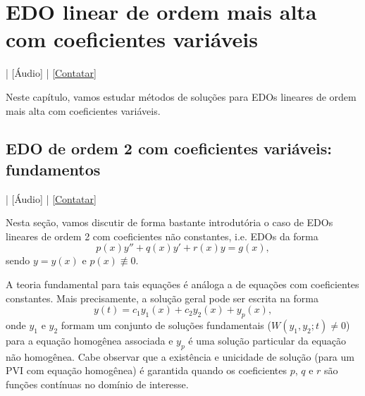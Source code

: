 
\chapter{EDO linear de ordem mais alta com coeficientes variáveis}\label{cap_edolcv}
\thispagestyle{fancy}

\begin{flushright}
  [Vídeo] | [Áudio] | \href{https://phkonzen.github.io/notas/contato.html}{[Contatar]}
\end{flushright}

Neste capítulo, vamos estudar métodos de soluções para EDOs lineares de ordem mais alta com coeficientes variáveis.

\section{EDO de ordem 2 com coeficientes variáveis: fundamentos}\label{cap_edolcv_sec_edo2lcvfun}

\begin{flushright}
  [Vídeo] | [Áudio] | \href{https://phkonzen.github.io/notas/contato.html}{[Contatar]}
\end{flushright}

Nesta seção, vamos discutir de forma bastante introdutória o caso de EDOs lineares de ordem 2 com coeficientes não constantes, i.e. EDOs da forma
\begin{equation}
  p(x)y'' + q(x)y' + r(x)y = g(x),
\end{equation}
sendo $y = y(x)$ e $p(x)\not\equiv 0$.

A teoria fundamental para tais equações é análoga a de equações com coeficientes constantes. Mais precisamente, a solução geral pode ser escrita na forma
\begin{equation}
  y(t) = c_1y_1(x) + c_2y_2(x) + y_p(x),
\end{equation}
onde $y_1$ e $y_2$ formam um conjunto de soluções fundamentais ($W(y_1,y_2;t)\neq 0$) para a equação homogênea associada e $y_p$ é uma solução particular da equação não homogênea. Cabe observar que a existência e unicidade de solução (para um PVI com equação homogênea) é garantida quando os coeficientes $p$, $q$ e $r$ são funções contínuas no domínio de interesse.

